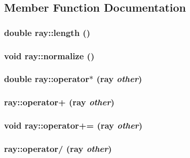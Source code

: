 \subsection{Member Function Documentation}
\subsubsection[{length}]{\setlength{\rightskip}{0pt plus 5cm}double ray::length ()}\label{classray_0998b159ca3d5b7196ee3e8cd7dafd97}


\subsubsection[{normalize}]{\setlength{\rightskip}{0pt plus 5cm}void ray::normalize ()}\label{classray_f715b58c77ef3e8d75b4058af13bda57}


\subsubsection[{operator$\ast$}]{\setlength{\rightskip}{0pt plus 5cm}double ray::operator$\ast$ ({\bf ray} {\em other})}\label{classray_3a6a56ccec9972dc3914e07b8ee6b15f}


\subsubsection[{operator+}]{ ray::operator+ ({\bf ray} {\em other})}\label{classray_018669471c0e2e0c5e5b0c78a6773535}


\subsubsection[{operator+=}]{\setlength{\rightskip}{0pt plus 5cm}void ray::operator+= ({\bf ray} {\em other})}\label{classray_dee2a59aa24f6bc20eebe68c1daaf909}


\subsubsection[{operator/}]{ ray::operator/ ({\bf ray} {\em other})}\label{classray_ea9732377ed3684c71f699feef534385}




